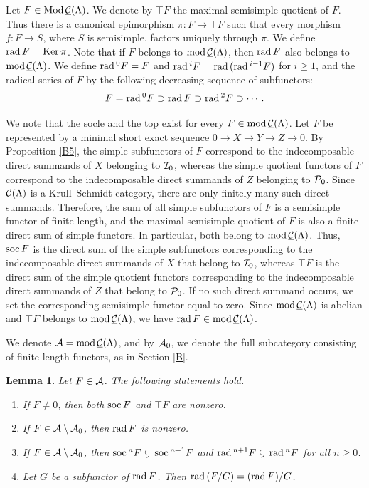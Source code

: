 \documentclass[11pt]{amsart}
\newtheorem{lemma}[theorem]{Lemma}
\theoremstyle{definition}
\numberwithin{equation}{section}
\begin{document}
Let $F \in \ModsCML$. 
We denote by $\top F$ the maximal semisimple quotient of $F$.  
Thus there is a canonical epimorphism $\pi : F \to \top F$ such that every morphism $f : F \to S$, where $S$ is semisimple, factors uniquely through $\pi$. 
We define $\rad F = \Ker \pi$. 
Note that if $F$ belongs to $\modsCML$, then $\rad F$ also belongs to $\modsCML$. 
We define $\rad^{0} F = F$ and $\rad^{i} F = \rad (\rad^{i-1} F)$ for $i \geq 1$, and the radical series of $F$ by the following decreasing sequence of subfunctors: 
$$
F = \rad^0 F \supset \rad F \supset \rad ^2 F \supset \cdots .
$$

We note that the socle and the top exist for every $F \in \modsCML$. 
Let $F$ be represented by a minimal short exact sequence $0 \to X \to Y \to Z \to 0$. 
By Proposition \ref{B5}, the simple subfunctors of $F$ correspond to the indecomposable direct summands of $X$ belonging to
$\II_0$, whereas the simple quotient functors of $F$ correspond to the indecomposable direct summands of $Z$ belonging to $\PP_0$. 
Since $\CML$ is a Krull--Schmidt category, there are only finitely many such direct summands. 
Therefore, the sum of all simple subfunctors of $F$ is a semisimple functor of finite length, and the maximal semisimple quotient of $F$ is also a finite direct sum of simple functors. 
In particular, both belong to $\modsCML$.
Thus, $\soc F$ is the direct sum of the simple subfunctors corresponding to the indecomposable direct summands of $X$ that belong to $\II_0$, whereas $\top F$ is the direct sum of the simple quotient functors corresponding to the indecomposable direct summands of $Z$ that belong to $\PP_0$. 
If no such direct summand occurs, we set the corresponding semisimple functor equal to zero. 
Since $\modsCML$ is abelian and $\top F$ belongs to $\modsCML$, we have $\rad F \in \modsCML$. 

We denote $\AA = \modsCML$, and by $\AA_0$, we denote the full subcategory consisting of finite length functors, as in Section \ref{B}.  

\begin{lemma}\label{C4}
Let $F \in \AA$. The following statements hold.
\begin{enumerate}[\rm(1)]
\item If $F \neq 0$, then both $\soc F$ and $\top F$ are nonzero. 

\item If $F \in \AA \setminus \AA_0$, then $\rad F$ is nonzero. 

\item If $F\in \AA\setminus \AA_0$, then $\soc ^n F \subsetneq \soc ^{n+1} F$ and $\rad ^{n+1} F \subsetneq  \rad^{n} F$ for all $n\geq 0$.

\item Let $G$ be a subfunctor of $\rad F$. Then $\rad (F/G) = (\rad F)/G$. 
\end{enumerate}
\end{lemma}
\end{document}
